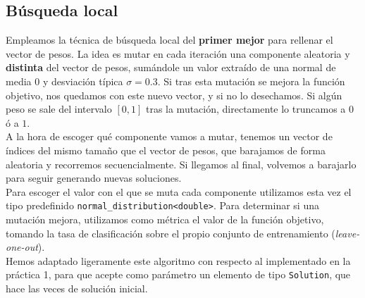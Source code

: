 \documentclass[12pt]{article}
\begin{document}
\subsection*{{\color{red} Búsqueda local}}

Empleamos la técnica de búsqueda local del \textbf{primer mejor} para rellenar el vector de pesos. La idea es mutar en cada iteración una componente aleatoria y \textbf{distinta} del vector de pesos, sumándole un valor extraído de una normal de media $0$ y desviación típica $\sigma = 0.3$. Si tras esta mutación se mejora la función objetivo, nos quedamos con este nuevo vector, y si no lo desechamos. Si algún peso se sale del intervalo $[0,1]$ tras la mutación, directamente lo truncamos a $0$ ó a $1$.\\

A la hora de escoger qué componente vamos a mutar, tenemos un vector de índices del mismo tamaño que el vector de pesos, que barajamos de forma aleatoria y recorremos secuencialmente. Si llegamos al final, volvemos a barajarlo para seguir generando nuevas soluciones. \\

Para escoger el valor con el que se muta cada componente utilizamos esta vez el tipo predefinido \verb|normal_distribution<double>|. Para determinar si una mutación mejora, utilizamos como métrica el valor de la función objetivo, tomando la tasa de clasificación sobre el propio conjunto de entrenamiento (\textit{leave-one-out}). \\

Hemos adaptado ligeramente este algoritmo con respecto al implementado en la práctica 1, para que acepte como parámetro un elemento de tipo \verb|Solution|, que hace las veces de solución inicial.\\

\vspace{20em}
\end{document}
